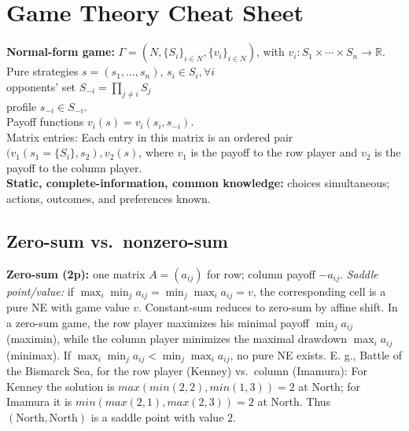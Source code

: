 \documentclass[9pt]{article}
\newcommand{\Players}{N}
\newcommand{\Sii}{S_{-i}}
\newcommand{\vi}{v_i}
\begin{document}
\newpage
\section*{Game Theory Cheat Sheet}

\textbf{Normal-form game:} $\Gamma=(\Players,\{S_i\}_{i\in\Players},\{\vi\}_{i\in\Players})$, with $\vi:S_1\times\cdots\times S_n\to\mathbb{R}$. \\
Pure strategies $s=(s_1,\dots,s_n)$, $s_i \in S_i, \forall i$\\
opponents’ set $\Sii=\prod_{j\neq i}S_j$ \\
profile $s_{-i}\in \Sii$.\\
Payoff functions $\vi(s)=\vi(s_i,s_{-i})$. \\
Matrix entries: Each entry in this matrix is an ordered pair $(v_1(s_1 = \{S_i\},s_2),v_2(s)$, where $v_1$ is the payoff to the row player and $v_2$ is the payoff to the column player. \\
\textbf{Static, complete-information, common knowledge:} choices simultaneous; actions, outcomes, and preferences known. %

\subsection*{Zero-sum vs.\ nonzero-sum}
\textbf{Zero-sum (2p):} one matrix $A=(a_{ij})$ for row; column payoff $-a_{ij}$. \emph{Saddle point/value:} if $\max_i\min_j a_{ij}=\min_j\max_i a_{ij}=v$, the corresponding cell is a pure NE with game value $v$. Constant-sum reduces to zero-sum by affine shift.
In a zero-sum game, the row player maximizes his minimal payoff $\min_j a_{ij}$ (maximin), while the column player minimizes the maximal drawdown $\max_i a_{ij}$ (minimax). If $\max_i\min_j a_{ij}<\min_j\max_i a_{ij}$, no pure NE exists. %
E. g., Battle of the Bismarck Sea, for the row player (Kenney) vs.\ column (Imamura):
For Kenney the solution is $max(min(2,2),min(1,3))=2$ at North; for Imamura it is $min(max(2,1),max(2,3))=2$ at North. Thus $(\text{North},\text{North})$ is a saddle point with value $2$. %
\end{document}
